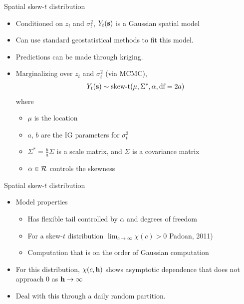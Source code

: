 \documentclass{beamer}
\begin{document}
\begin{frame}{Spatial skew-$t$ distribution}
  \begin{itemize} \setlength{\itemsep}{0.5em}
   \item \alert{Conditioned} on $z_t$ and $\sigma^2_t$, $Y_t(\mbox{\bf s})$ is a Gaussian spatial model
    \item Can use standard geostatistical methods to fit this model.
    \item Predictions can be made through kriging.
    \item \alert{Marginalizing} over $z_t$ and $\sigma^2_t$ (via MCMC),
    \begin{align*}
      Y_t(\mbox{\bf s}) \sim \text{skew-t}(\mu, \Sigma^*, \alpha, \text{df}=2a)
    \end{align*}
    where
    \begin{itemize}
    	\item $\mu$ is the location
	\item $a$, $b$ are the IG parameters for $\sigma^2_t$
	\item $\Sigma^* = \frac{ b }{ a } \Sigma$ is a scale matrix, and $\Sigma$ is a \Matern covariance matrix
	\item $\alpha \in {\cal R}$ controls the skewness
    \end{itemize}
  \end{itemize}
\end{frame}

\begin{frame}{Spatial skew-$t$ distribution}
  \begin{itemize} \setlength{\itemsep}{0.5em}
      \item Model properties
    \begin{itemize}
    	\item Has flexible tail controlled by $\alpha$ and degrees of freedom
    	\item For a skew-$t$ distribution $\lim_{c \rightarrow \infty} \chi(c) > 0$ Padoan, 2011)
    	\item Computation that is on the order of Gaussian computation
    \end{itemize}
    \item For this distribution, $\chi(c, \mbox{\bf h})$ shows asymptotic dependence that does not approach 0 as $\mbox{\bf h} \rightarrow \infty$ 
    \item Deal with this through a daily random partition.
  \end{itemize}
\end{frame}
\end{document}
